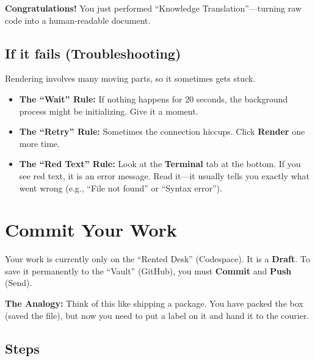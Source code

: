 \documentclass[
  letterpaper,
  DIV=11,
  numbers=noendperiod,
  oneside]{scrreprt}
\providecommand{\tightlist}{%
  \setlength{\itemsep}{0pt}\setlength{\parskip}{0pt}}
\begin{document}
\textbf{Congratulations!} You just performed ``Knowledge
Translation''---turning raw code into a human-readable document.

\section{If it fails
(Troubleshooting)}\label{if-it-fails-troubleshooting}

Rendering involves many moving parts, so it sometimes gets stuck.

\begin{itemize}
\tightlist
\item
  \textbf{The ``Wait'' Rule:} If nothing happens for 20 seconds, the
  background process might be initializing. Give it a moment.
\item
  \textbf{The ``Retry'' Rule:} Sometimes the connection hiccups. Click
  \textbf{Render} one more time.
\item
  \textbf{The ``Red Text'' Rule:} Look at the \textbf{Terminal} tab at
  the bottom. If you see red text, it is an error message. Read it---it
  usually tells you exactly what went wrong (e.g., ``File not found'' or
  ``Syntax error'').
\end{itemize}

\chapter{Commit Your Work}\label{commit-your-work}

Your work is currently only on the ``Rented Desk'' (Codespace). It is a
\textbf{Draft}. To save it permanently to the ``Vault'' (GitHub), you
must \textbf{Commit} and \textbf{Push} (Send).

\textbf{The Analogy:} Think of this like shipping a package. You have
packed the box (saved the file), but now you need to put a label on it
and hand it to the courier.

\section{Steps}\label{steps-2}
\end{document}

